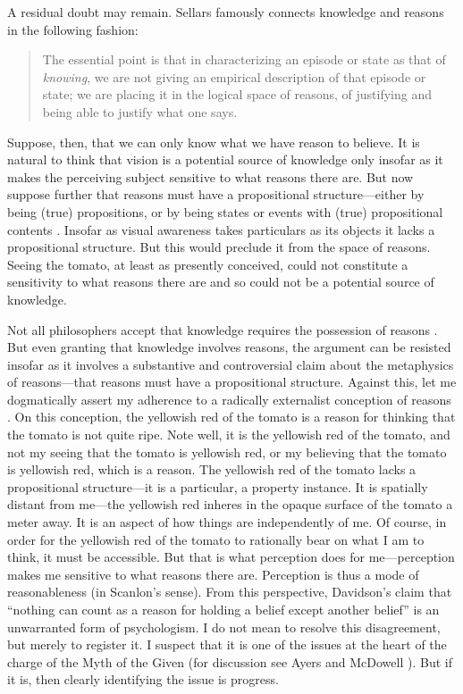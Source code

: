 \documentclass[12pt]{article}
\begin{document}
A residual doubt may remain. Sellars famously connects knowledge and reasons in the following fashion:
\begin{quote}
	The essential point is that in characterizing an episode or state as that of \emph{knowing}, we are not giving an empirical description of that episode or state; we are placing it in the logical space of reasons, of justifying and being able to justify what one says. \citep[§36]{Sellars:1956xp}
\end{quote}
Suppose, then, that we can only know what we have reason to believe. It is natural to think that vision is a potential source of knowledge only insofar as it makes the perceiving subject sensitive to what reasons there are. But now suppose further that reasons must have a propositional structure---either by being (true) propositions, or by being states or events with (true) propositional contents \citep[see][141, 143--4]{McDowell:1996uq}. Insofar as visual awareness takes particulars as its objects it lacks a propositional structure. But this would preclude it from the space of reasons. Seeing the tomato, at least as presently conceived, could not constitute a sensitivity to what reasons there are and so could not be a potential source of knowledge.

Not all philosophers accept that knowledge requires the possession of reasons \citep[see][]{Pryor:2007fk}. But even granting that knowledge involves reasons, the argument can be resisted insofar as it involves a substantive and controversial claim about the metaphysics of reasons---that reasons must have a propositional structure. Against this, let me dogmatically assert my adherence to a radically externalist conception of reasons \citep[see][]{Scanlon:1998hb,Raz:2000tm}. On this conception, the yellowish red of the tomato is a reason for thinking that the tomato is not quite ripe. Note well, it is the yellowish red of the tomato, and not my seeing that the tomato is yellowish red, or my believing that the tomato is yellowish red, which is a reason. The yellowish red of the tomato lacks a propositional structure---it is a particular, a property instance. It is spatially distant from me---the yellowish red inheres in the opaque surface of the tomato a meter away. It is an aspect of how things are independently of me. Of course, in order for the yellowish red of the tomato to rationally bear on what I am to think, it must be accessible. But that is what perception does for me---perception makes me sensitive to what reasons there are. Perception is thus a mode of reasonableness (in Scanlon's \citeyear[]{Scanlon:1998hb} sense). From this perspective, Davidson's \citeyearpar[310]{Davidson:1986uq} claim that ``nothing can count as a reason for holding a belief except another belief'' is an unwarranted form of psychologism. I do not mean to resolve this disagreement, but merely to register it. I suspect that it is one of the issues at the heart of the charge of the Myth of the Given (for discussion see Ayers \citeyear{Ayers:2004kx} and McDowell \citeyear{McDowell:2006vn}). But if it is, then clearly identifying the issue is progress.
\end{document}
